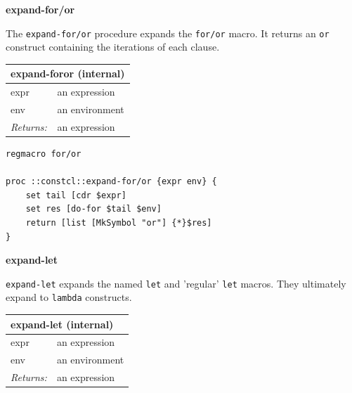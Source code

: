 \documentclass[twoside,9pt]{report}
\begin{document}
\textbf{expand-for/or}


The \texttt{expand-for/or} procedure expands the \texttt{for/or} macro. It returns an \texttt{or} construct containing the iterations of each clause.

\begin{tabular}{ |l l| }
\hline
\multicolumn{2}{|l|}{expand-foror (internal)} \\
\hline
expr & an expression \\
env & an environment \\
\textit{Returns:} & an expression \\
\hline
\end{tabular}

\noindent\makebox[\linewidth]{\rule{\linewidth}{0.4pt}}
\begin{lstlisting}
regmacro for/or
 
proc ::constcl::expand-for/or {expr env} {
    set tail [cdr $expr]
    set res [do-for $tail $env]
    return [list [MkSymbol "or"] {*}$res]
}
\end{lstlisting}
\noindent\makebox[\linewidth]{\rule{\linewidth}{0.4pt}}

\textbf{expand-let}


\texttt{expand-let} expands the named \texttt{let} and 'regular' \texttt{let} macros. They ultimately expand to \texttt{lambda} constructs.

\begin{tabular}{ |l l| }
\hline
\multicolumn{2}{|l|}{expand-let (internal)} \\
\hline
expr & an expression \\
env & an environment \\
\textit{Returns:} & an expression \\
\hline
\end{tabular}
\end{document}
